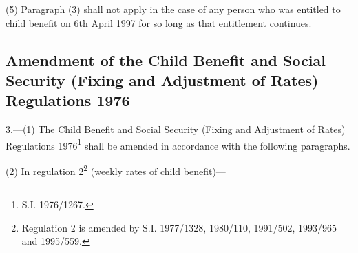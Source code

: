 \documentclass[a4paper]{article}
\newcommand\fnote[1]{\footnote{\frenchspacing #1}}
\begin{document}
(5) Paragraph (3) shall not apply in the case of any person who was entitled to child benefit on 6th April 1997 for so long as that entitlement continues. %

\subsection[3. Amendment of the Child Benefit and Social Security (Fixing and Adjustment of Rates) Regulations 1976]{Amendment of the Child Benefit and Social Security (Fixing and Adjustment of Rates) Regulations 1976}

3.---(1) The Child Benefit and Social Security (Fixing and Adjustment of Rates) Regulations 1976\fnote{S.I. 1976/1267.} shall be amended in accordance with the following paragraphs.

(2) In regulation 2\fnote{Regulation 2 is amended by S.I. 1977/1328, 1980/110, 1991/502, 1993/965 and 1995/559.} (weekly rates of child benefit)---
\end{document}
